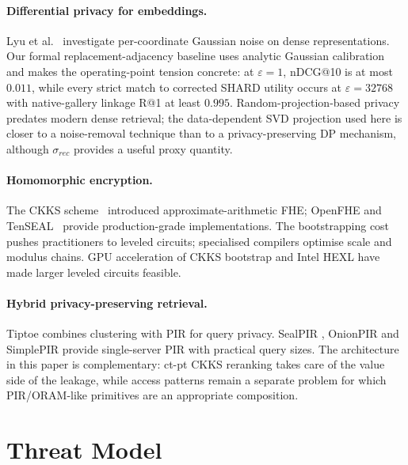 \paragraph{Differential privacy for embeddings.} Lyu et al.~\cite{ref_lyu}
investigate per-coordinate Gaussian noise on dense representations. Our
formal replacement-adjacency baseline uses analytic Gaussian calibration and
makes the operating-point tension concrete: at $\varepsilon=1$, nDCG@10 is at
most $0.011$, while every strict match to corrected SHARD utility occurs at
$\varepsilon=32768$ with native-gallery linkage R@1 at least $0.995$.
Random-projection-based privacy
\cite{ref_jl,ref_liu,ref_kenthapadi} predates modern dense retrieval; the
data-dependent SVD projection used here is closer to a noise-removal
technique than to a privacy-preserving DP mechanism, although
$\sigma_{rec}$ provides a useful proxy quantity.

\paragraph{Homomorphic encryption.} The CKKS scheme~\cite{ref_ckks}
introduced approximate-arithmetic FHE; OpenFHE \cite{ref_openfhe} and
TenSEAL~\cite{ref_tenseal} provide production-grade implementations.
The bootstrapping cost \cite{ref_ckks_bootstrap} pushes practitioners
to leveled circuits; specialised compilers \cite{ref_eva,ref_chet}
optimise scale and modulus chains.
GPU acceleration of CKKS bootstrap \cite{ref_jung_gpu} and Intel HEXL
\cite{ref_hexl} have made larger leveled circuits feasible.

\paragraph{Hybrid privacy-preserving retrieval.} Tiptoe \cite{ref_tiptoe}
combines clustering with PIR for query privacy. SealPIR
\cite{ref_sealpir}, OnionPIR \cite{ref_onionpir} and SimplePIR
\cite{ref_simplepir} provide single-server PIR with practical query sizes.
The architecture in this paper is complementary: ct-pt CKKS reranking
takes care of the value side of the leakage, while access patterns
remain a separate problem for which PIR/ORAM-like primitives are an
appropriate composition.

\section{Threat Model}\label{sec:threat}


